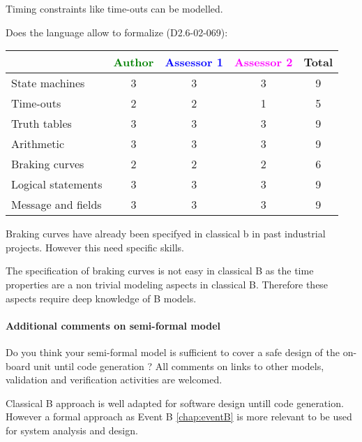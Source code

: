 \begin{author_comment}
Timing constraints like time-outs can be modelled.
\end{author_comment}


Does the language allow to  formalize (D2.6-02-069):

\begin{tabular}{|l | c | c | c | c|}
\hline
& \textcolor{green}{Author} & \textcolor{blue}{Assessor 1} & \textcolor{magenta}{Assessor 2} & Total \\
\hline 
State machines  & 3 & 3 & 3 & 9 \\
\hline
Time-outs  & 2 & 2 & 1 & 5  \\
\hline
Truth tables  & 3 & 3 & 3 & 9 \\
\hline
Arithmetic  & 3 & 3 & 3 & 9 \\
\hline
Braking curves  & 2 & 2 & 2 & 6 \\
\hline
Logical statements & 3 & 3 & 3 & 9 \\
\hline
Message and fields & 3 & 3 & 3 & 9 \\
\hline
\end{tabular}


\begin{author_comment}
Braking curves have already been specifyed in classical b  in past industrial projects. However this need specific skills.
\end{author_comment}


\begin{assessor2}
The specification of braking curves is not easy in classical B as the time properties are a non trivial modeling aspects in classical B. Therefore these aspects require deep knowledge of B models.
\end{assessor2}

\paragraph{Additional comments on semi-formal  model} Do you think your semi-formal  model is sufficient to cover a safe design of the on-board unit until code generation ?
All comments on links to  other models, validation and verification activities are welcomed.



\begin{author_comment}
Classical B  approach is well adapted for software design untill code generation. However a formal approach as Event B \ref{chap:eventB} is more relevant to be used for system analysis and design.
\end{author_comment}


